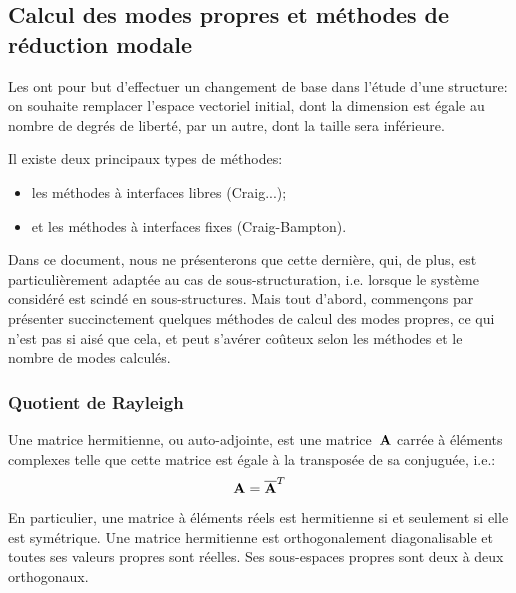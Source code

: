 \medskip
\subsection{Calcul des modes propres et méthodes de réduction modale}

Les  ont pour but d'effectuer un changement de base dans l'étude d'une structure: on souhaite remplacer l'espace vectoriel initial, dont la dimension est égale au nombre de degrés de liberté, par un autre, dont la taille sera inférieure.

\medskip
Il existe deux principaux types de méthodes:
\begin{itemize}
  \item les méthodes à interfaces libres (Craig...);
  \item et les méthodes à interfaces fixes (Craig-Bampton).
\end{itemize}
Dans ce document, nous ne présenterons que cette dernière, qui, de plus, est particulièrement adaptée au cas de sous-structuration, i.e. lorsque le système considéré est scindé en sous-structures.
\medskipvm
Mais tout d'abord, commençons par présenter succinctement quelques méthodes de calcul des modes propres, ce qui n'est pas si aisé que cela, et peut s'avérer coûteux selon les méthodes et le nombre de modes calculés.

\medskip
\subsubsection{Quotient de Rayleigh}

\begin{definition}
Une matrice hermitienne, ou auto-adjointe, est une matrice~$\MM{A}$ carrée à éléments complexes telle que cette matrice est égale à la transposée de sa conjuguée, i.e.:
\begin{equation}
\MM{A} = \overline{\MM{A}}^T
\end{equation}
\end{definition}
En particulier, une matrice à éléments réels est hermitienne si et seulement si elle est symétrique.
\medskipvm
Une matrice hermitienne est orthogonalement diagonalisable et toutes ses valeurs propres sont réelles. Ses sous-espaces propres sont deux à deux orthogonaux.

